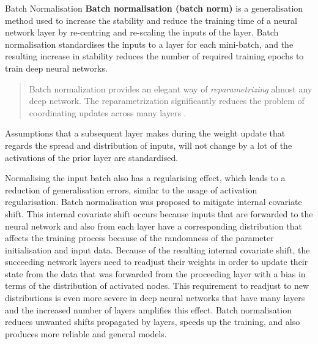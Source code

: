   \begin{pabox}{Batch Normalisation}
  \label{def:batch-normalisation-definition}
    \textbf{Batch normalisation (batch norm)} is a generalisation method used to increase the stability and reduce the training time of a neural network layer by re-centring and re-scaling the inputs of the layer.
    Batch normalisation standardises the inputs to a layer for each mini-batch, and the resulting increase in stability reduces the number of required training epochs to train deep neural networks.

    \begin{quote}
      Batch normalization provides an elegant way of \emph{reparametrizing} almost any deep network. 
      The reparametrization significantly reduces the problem of coordinating updates across many layers \cite{goodfellowDeepLearning2016}.
    \end{quote}
    Assumptions that a subsequent layer makes during the weight update that regards the spread and distribution of inputs, will not change by a lot of the activations of the prior layer are standardised. 
  \end{pabox}
  \raggedbottom
  Normalising the input batch also has a regularising effect, which leads to a reduction of generalisation errors, similar to the usage of activation regularisation.
  Batch normalisation was proposed to mitigate internal covariate shift. This internal covariate shift occurs because inputs that are forwarded to the neural network and also from each layer have a corresponding distribution that affects the training process because of the randomness of the parameter initialisation and input data.
  Because of the resulting internal covariate shift, the succeeding network layers need to readjust their weights in order to update their state from the data that was forwarded from the proceeding layer with a bias in terms of the distribution of activated nodes. This requirement to readjust to new distributions is even more severe in deep neural networks that have many layers and the increased number of layers amplifies this effect. Batch normalisation reduces unwanted shifts propagated by layers, speeds up the training, and also produces more reliable and general models.
  


